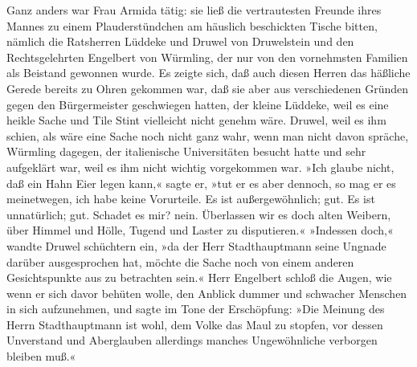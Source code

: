 Ganz anders war Frau Armida tätig: sie ließ die vertrautesten
Freunde ihres Mannes zu einem Plauderstündchen am häuslich
beschickten Tische bitten, nämlich die Ratsherren Lüddeke und
Druwel von Druwelstein und den Rechtsgelehrten Engelbert von
Würmling, der nur von den \pagenum{[14]} vornehmsten Familien als
Beistand gewonnen wurde. Es zeigte sich, daß auch diesen Herren das
häßliche Gerede bereits zu Ohren gekommen war, daß sie aber aus
verschiedenen Gründen gegen den Bürgermeister geschwiegen hatten,
der kleine Lüddeke, weil es eine heikle Sache und Tile Stint
vielleicht nicht genehm wäre. Druwel, weil es ihm schien, als wäre
eine Sache noch nicht ganz wahr, wenn man nicht davon spräche,
Würmling dagegen, der italienische Universitäten besucht hatte und
sehr aufgeklärt war, weil es ihm nicht wichtig vorgekommen war.
»Ich glaube nicht, daß ein Hahn Eier legen kann,« sagte er, »tut er
es aber dennoch, so mag er es meinetwegen, ich habe keine
Vorurteile. Es ist außergewöhnlich; gut. Es ist unnatürlich; gut.
Schadet es mir? nein. Überlassen wir es doch alten Weibern, über
Himmel und Hölle, Tugend und Laster zu disputieren.« »Indessen
doch,« wandte Druwel schüchtern ein, »da der Herr Stadthauptmann
seine Ungnade darüber ausgesprochen hat, möchte die Sache noch von
einem anderen Gesichtspunkte aus zu betrachten sein.« Herr
Engelbert schloß die Augen, wie wenn er sich davor behüten wolle,
den Anblick dummer und schwacher Menschen in sich aufzunehmen, und
sagte im Tone der Erschöpfung: »Die Meinung des Herrn
Stadthauptmann ist wohl, dem Volke das Maul zu stopfen, vor dessen
Unverstand und Aberglauben allerdings manches Ungewöhnliche
verborgen bleiben muß.«

